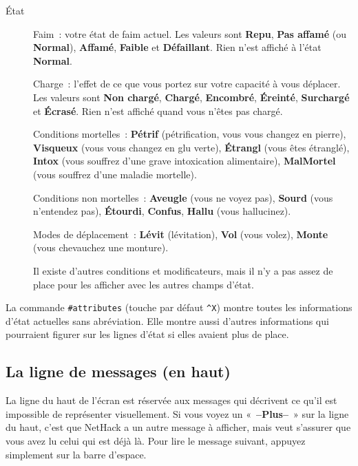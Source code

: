 \documentclass[titlepage]{article}
\begin{document}
\begin{description}
\item[{État}]
Faim~:
votre état de faim actuel.
Les valeurs sont \textbf{Repu}, \textbf{Pas affamé} (ou \textbf{Normal}),
\textbf{Affamé}, \textbf{Faible} et \textbf{Défaillant}.
Rien n'est affiché à l'état \textbf{Normal}.


Charge~:
l'effet de ce que vous portez sur votre capacité à vous déplacer.
Les valeurs sont \textbf{Non chargé}, \textbf{Chargé}, \textbf{Encombré},
\textbf{Éreinté}, \textbf{Surchargé} et \textbf{Écrasé}.
Rien n'est affiché quand vous n'êtes pas chargé.


Conditions mortelles~:
\textbf{Pétrif} (pétrification, vous vous changez en pierre),
\textbf{Visqueux} (vous vous changez en glu verte),
\textbf{Étrangl} (vous êtes étranglé),
\textbf{Intox} (vous souffrez d'une grave intoxication alimentaire),
\textbf{MalMortel} (vous souffrez d'une maladie mortelle).


Conditions non mortelles~:
\textbf{Aveugle} (vous ne voyez pas), \textbf{Sourd} (vous n'entendez pas),
\textbf{Étourdi}, \textbf{Confus}, \textbf{Hallu} (vous hallucinez).


Modes de déplacement~:
\textbf{Lévit} (lévitation), \textbf{Vol} (vous volez), \textbf{Monte} (vous
chevauchez une monture).


Il existe d'autres conditions et modificateurs, mais il n'y a pas assez de
place pour les afficher avec les autres champs d'état.

\end{description}

La commande \texttt{\#attributes} (touche par défaut \texttt{\textasciicircum{}X}) montre
toutes les informations d'état actuelles sans abréviation.
Elle montre aussi d'autres informations qui pourraient figurer sur les
lignes d'état si elles avaient plus de place.

\subsection{La ligne de messages (en haut)}



La ligne du haut de l'écran est réservée aux messages qui décrivent ce
qu'il est impossible de représenter visuellement.
Si vous voyez un
«~\textbf{--Plus--}~» sur la ligne du haut, c'est que NetHack a un
autre message à afficher, mais veut s'assurer que vous avez lu celui qui
est déjà là.
Pour lire le message suivant, appuyez simplement sur la barre d'espace.
\end{document}
